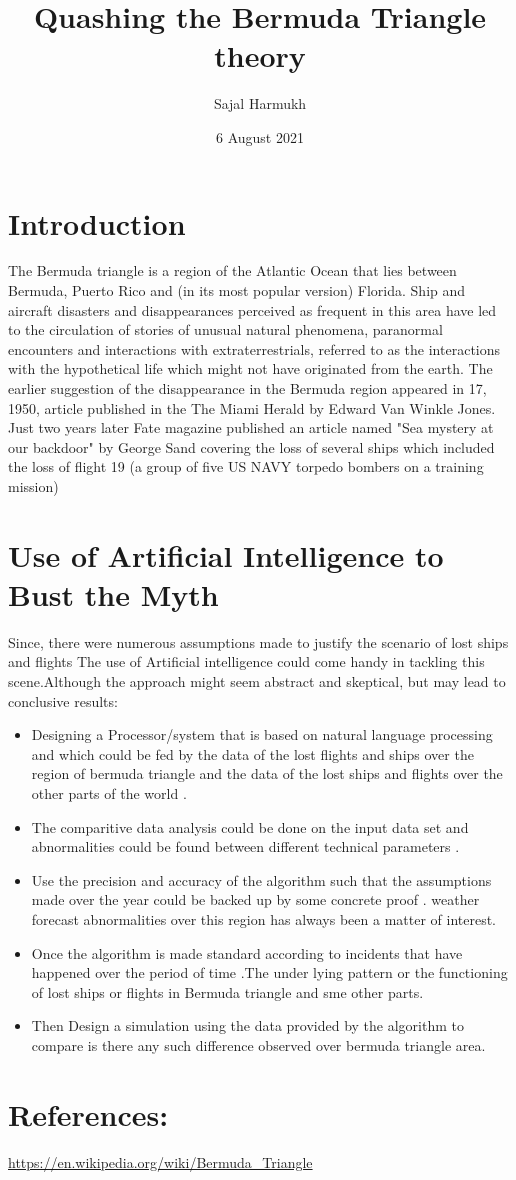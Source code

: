 \documentclass{article}
\title{Quashing the Bermuda Triangle theory}
\author{Sajal Harmukh}
\date{6 August 2021}
\begin{document}
\maketitle

\section*{Introduction}
The Bermuda triangle is a region of the Atlantic Ocean that lies between Bermuda, Puerto Rico and (in its most popular version) Florida. Ship and aircraft disasters and disappearances perceived as frequent in this area have led to the circulation of stories of unusual natural phenomena, paranormal encounters and interactions with extraterrestrials, referred to as the interactions with the hypothetical life which might not have originated from the earth.
\newline
The earlier suggestion of the disappearance in the Bermuda region appeared in 17, 1950, article published in the The Miami Herald by Edward Van Winkle Jones. Just two years later Fate magazine published an article named "Sea mystery at our backdoor" by George Sand covering the loss of several ships which included the loss of flight 19 (a group of five US NAVY torpedo bombers on a training mission)
\newline

\section*{Use of Artificial Intelligence to Bust the Myth}
Since, there were numerous assumptions made to justify the scenario of lost ships and flights
The use of Artificial intelligence could come handy in tackling this scene.Although the approach might seem abstract and skeptical, but may lead to conclusive results:
\begin{itemize}
\item Designing a Processor/system that is based on natural language processing and which could be fed by the data of the lost flights and ships over the region of bermuda triangle and the data of the lost ships and flights over the other parts of the world .
\item The comparitive data analysis could be done on the input data set and abnormalities could be found between different technical parameters .
\item Use the precision and accuracy of the algorithm such that the assumptions made over the year could be backed up by some concrete proof . weather forecast abnormalities over this region has always been a matter of interest.
\item Once the algorithm is made standard according to incidents that have happened over the period of time .The under lying pattern or the functioning of lost ships or flights in Bermuda triangle and sme other parts.
\item Then Design a simulation using the data provided by the algorithm to compare is there any such difference observed over bermuda triangle area.

\end{itemize}

\section*{References:}
\url{https://en.wikipedia.org/wiki/Bermuda_Triangle}
\end{document}
